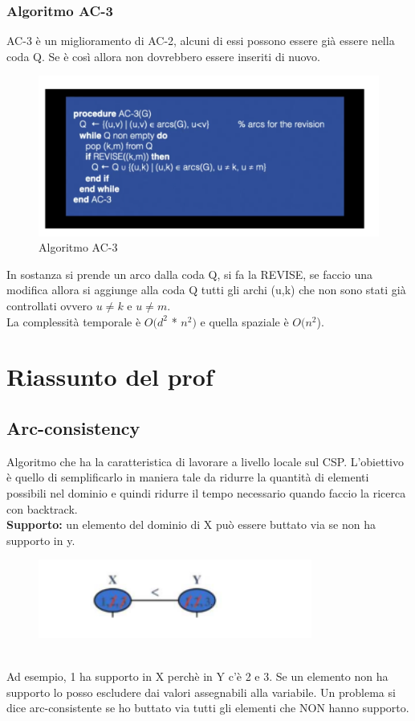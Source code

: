 \subsubsection{Algoritmo AC-3}
AC-3 è un miglioramento di AC-2, alcuni di essi possono essere già essere nella coda Q. Se è così allora non dovrebbero essere inseriti di nuovo.
\begin{figure}[htp]
	\centering
    \includegraphics[width=13cm, keepaspectratio]{img/Cap3/ac-3.png}
    \caption{Algoritmo AC-3}
\end{figure}
In sostanza si prende un arco dalla coda Q, si fa la REVISE, se faccio una modifica allora si aggiunge alla coda Q tutti gli archi (u,k) che non sono stati già controllati ovvero $u \neq k$ e $u \neq m$.
\\La complessità temporale è $O(d^2$ * $n^2)$ e quella spaziale è $O(n^2$).
\newpage
\section{Riassunto del prof}
\subsection{Arc-consistency}
Algoritmo che ha la caratteristica di lavorare a livello locale sul CSP. L’obiettivo è quello di semplificarlo in maniera tale da ridurre la quantità di elementi possibili nel dominio e quindi ridurre il tempo necessario quando faccio la ricerca con backtrack.
\\\textbf{Supporto: } un elemento del dominio di X può essere buttato via se non ha supporto in y.
\begin{figure}[htp]
	\centering
    \includegraphics[width=9cm, keepaspectratio]{img/Cap3/riassunto1.png}
\end{figure}
\\Ad esempio, 1 ha supporto in X perchè in Y c’è 2 e 3. Se un elemento non ha supporto lo posso escludere dai valori assegnabili alla variabile. Un problema si dice arc-consistente se ho buttato via tutti gli elementi che NON hanno supporto.

